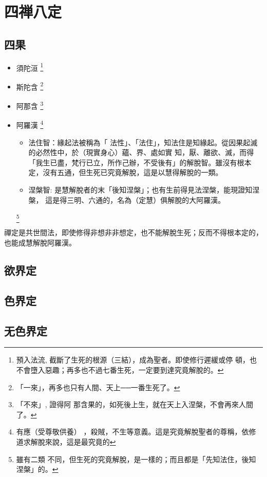 \section{四禅八定}

\subsection{四果}
\begin{itemize}
  \item 須陀洹
    \footnote{預入法流, 截斷了生死的根源（三結），成為聖者。即使修行遲緩或停 頓，也不會墮入惡趣；再多也不過七番生死，一定要到達究竟解脫的。}
  \item 斯陀含
    \footnote{「一來」，再多也只有人間、天上──一番生死了。}
  \item 阿那含
    \footnote{「不來」, 證得阿 那含果的，如死後上生，就在天上入涅槃，不會再來人間了。}
  \item 阿羅漢
    \footnote{有應（受尊敬供養） ，殺賊，不生等意義。這是究竟解脫聖者的尊稱，依修道求解脫來說，這是最究竟的}
    \begin{itemize}
      \item 法住智：緣起法被稱為「 法性」、「法住」，知法住是知緣起。從因果起滅的必然性中，於（現實身心）蘊、界、處如實 知，厭、離欲、滅，而得「我生已盡，梵行已立，所作己辦，不受後有」的解脫智。雖沒有根本 定，沒有五通，但生死已究竟解脫，這是以慧得解脫的一類。
      \item 涅槃智:  是慧解脫者的末「後知涅槃」；也有生前得見法涅槃，能現證知涅槃， 這是得三明、六通的，名為（定慧）俱解脫的大阿羅漢。
    \end{itemize}
    \footnote{雖有二類 不同，但生死的究竟解脫，是一樣的；而且都是「先知法住，後知涅槃」的。}
\end{itemize}
禪定是共世間法，即使修得非想非非想定，也不能解脫生死；反而不得根本定的，也能成慧解脫阿羅漢。

\subsection{欲界定}
\subsection{色界定}
\subsection{无色界定}
